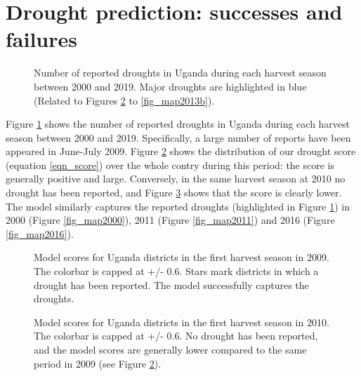 \documentclass[10pt,parskip=half,
toc=sectionentrywithdots,
bibliography=totocnumbered,
captions=tableheading,numbers=noendperiod]{scrartcl}
\begin{document}
\hypertarget{drought-prediction-successes-and-failures}{%
\section{Drought prediction: successes and
failures}\label{drought-prediction-successes-and-failures}}

\begin{figure}[H]\begin{center}\end{center}\caption{Number of reported droughts in Uganda during each harvest season between
2000 and 2019. Major droughts are highlighted in blue (Related to
Figures \ref{fig_map2009} to \ref{fig_map2013b}).}\label{fig_droughtcount_seasonal}\end{figure}

Figure \ref{fig_droughtcount_seasonal} shows the number of reported
droughts in Uganda during each harvest season between 2000 and 2019.
Specifically, a large number of reports have been appeared in June-July
2009. Figure \ref{fig_map2009} shows the distribution of our drought
score (equation \ref{eqn_score}) over the whole contry during this
period: the score is generally positive and large. Conversely, in the
same harvest season at 2010 no drought has been reported, and Figure
\ref{fig_map2010} shows that the score is clearly lower. The model
similarly captures the reported droughts (highlighted in Figure
\ref{fig_droughtcount_seasonal}) in 2000 (Figure \ref{fig_map2000}),
2011 (Figure \ref{fig_map2011}) and 2016 (Figure \ref{fig_map2016}).

\begin{figure}[H]\begin{center}\end{center}\caption{Model scores for Uganda districts in the first harvest season in 2009.
The colorbar is capped at +/- 0.6. Stars mark districts in which a
drought has been reported. The model successfully captures the droughts.}\label{fig_map2009}\end{figure}

\begin{figure}[H]\begin{center}\end{center}\caption{Model scores for Uganda districts in the first harvest season in 2010.
The colorbar is capped at +/- 0.6. No drought has been reported, and the
model scores are generally lower compared to the same period in 2009
(see Figure \ref{fig_map2009}).}\label{fig_map2010}\end{figure}
\end{document}

